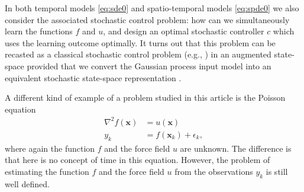 \documentclass[journal]{IEEEtran}
\newcommand{\simo}[1]{{\color{red}#1}}
\begin{document}
In both temporal models \eqref{eq:sde0} and spatio-temporal models \eqref{eq:spde0} we also consider the associated stochastic control problem: how can we simultaneously learn the functions $f$ and $u$, and design an optimal stochastic controller $c$ which uses the learning outcome optimally. It turns out that this problem can be recasted as a classical stochastic control problem (e.g., \cite{Maybeck:1982b}) in an augmented state-space provided that we convert the Gaussian process input model into an equivalent stochastic state-space representation \cite{Hartikainen+Sarkka:2010,Hartikainen+Sarkka:2011,Hartikainen+Seppanen+Sarkka:2012}.

A different kind of example of a problem studied in this article is the Poisson equation
%
\begin{equation}
\begin{split}
  \nabla^2 f(\mathbf{x}) &= u(\mathbf{x}) \\
  y_k &= f(\mathbf{x}_k) + \epsilon_k,
\end{split}
\label{eq:poisson0}
\end{equation}
%
where again the function $f$ and the force field $u$ are unknown. The difference is that here is no concept of time in this equation. However, the problem of estimating the function $f$ and the force field $u$ from the observations $y_k$ is still well defined.




\end{document}
